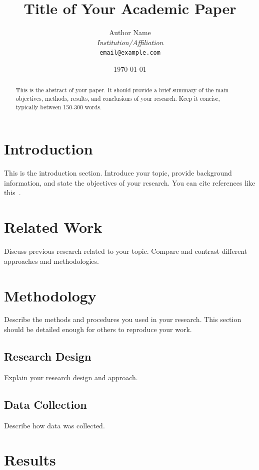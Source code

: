 \documentclass[12pt,a4paper]{article}
\title{Title of Your Academic Paper}
\author{Author Name\\
        \textit{Institution/Affiliation}\\
        \texttt{email@example.com}}
\date{\today}
\begin{document}
\maketitle

\begin{abstract}
This is the abstract of your paper. It should provide a brief summary of the main objectives, methods, results, and conclusions of your research. Keep it concise, typically between 150-300 words.
\end{abstract}

\section{Introduction}
\label{sec:introduction}

This is the introduction section. Introduce your topic, provide background information, and state the objectives of your research. You can cite references like this~\cite{example2024}.

\section{Related Work}
\label{sec:related-work}

Discuss previous research related to your topic. Compare and contrast different approaches and methodologies.

\section{Methodology}
\label{sec:methodology}

Describe the methods and procedures you used in your research. This section should be detailed enough for others to reproduce your work.

\subsection{Research Design}
\label{subsec:research-design}

Explain your research design and approach.

\subsection{Data Collection}
\label{subsec:data-collection}

Describe how data was collected.

\section{Results}
\label{sec:results}
\end{document}
